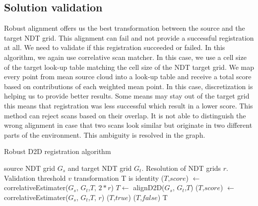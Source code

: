 \subsection{Solution validation}
Robust alignment offers us the best transformation between the source and the target \gls{NDT} grid. This alignment can fail and not provide a successful registration at all. We need to validate if this registration succeeded or failed. In this algorithm, we again use correlative scan matcher. In this case, we use a cell size of the target look-up table matching the cell size of the \gls{NDT} target grid. We map every point from mean source cloud into a look-up table and receive a total score based on contributions of each weighted mean point. In this case, discretization is helping us to provide better results. Some means may stay out of the target grid this means that registration was less successful which result in a lower score. This method can reject scans based on their overlap. It is not able to distinguish the wrong alignment in case that two scans look similar but originate in two different parts of the environment. This ambiguity is resolved in the graph.

\begin{algorithm}
\label{alg:robust_d2d}
    \caption{Robust \gls{D2D} registration algorithm}
\begin{algorithmic}[1]
\Require source \gls{NDT} grid $G_{s}$ and target \gls{NDT} grid $G_{t}$. Resolution of \gls{NDT} grids $r$. Validation threshold $v$
 \State transformation T is identity
 \State ($T$,$score$) $\gets$ correlativeEstimater($G_{s}$, $G_{t}$,$T$, $2*r$)
 \State $T \gets$ alignD2D($G_{s}$, $G_{t}$,$T$)
 \State ($T$,$score$) $\gets$ correlativeEstimater($G_{s}$, $G_{t}$,$T$, $r$)
	 \State \Return ($T$,$true$) 
 \Else
	 \State \Return ($T$,$false$)
 \EndIf
 \State \Return T 
 \EndFunction
\end{algorithmic}
\end{algorithm}

